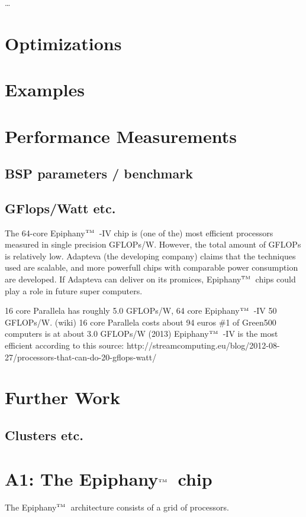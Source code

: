 \documentclass[fleqn]{article}
\renewcommand{\(}{\left(}
\renewcommand{\)}{\right)}
\def\tm{$^{\hbox{\tiny TM}}$~}
\begin{document}
\ldots

\section{Optimizations}

\section{Examples}

\section{Performance Measurements}

\subsection{BSP parameters / benchmark}

\subsection{GFlops/Watt etc.}
The 64-core Epiphany\tm-IV chip is (one of the) most efficient processors measured in single precision GFLOPs/W. However, the total amount of GFLOPs is relatively low. Adapteva (the developing company) claims that the techniques used are scalable, and more powerfull chips with comparable power consumption are developed. If Adapteva can deliver on its promices, Epiphany\tm chips could play a role in future super computers.

16 core Parallela has roughly 5.0 GFLOPs/W, 64 core Epiphany\tm-IV 50 GFLOPs/W. (wiki)
16 core Parallela costs about 94 euros
\#1 of Green500 computers is at about 3.0 GFLOPs/W (2013)
Epiphany\tm-IV is the most efficient according to this source:
http://streamcomputing.eu/blog/2012-08-27/processors-that-can-do-20-gflops-watt/

\section{Further Work}

\subsection{Clusters etc.}

\section{A1: The Epiphany\tm chip}
The Epiphany\tm architecture consists of a grid of processors.
\end{document}
